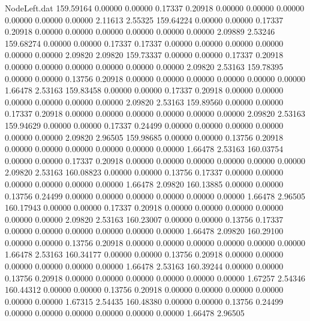 \begin{filecontents}{NodeLeft.dat}
 159.59164    0.00000    0.00000     0.17337    0.20918    0.00000    0.00000    0.00000    0.00000    0.00000    0.00000    2.11613    2.55325
 159.64224    0.00000    0.00000     0.17337    0.20918    0.00000    0.00000    0.00000    0.00000    0.00000    0.00000    2.09889    2.53246
 159.68274    0.00000    0.00000     0.17337    0.17337    0.00000    0.00000    0.00000    0.00000    0.00000    0.00000    2.09820    2.09820
 159.73337    0.00000    0.00000     0.17337    0.20918    0.00000    0.00000    0.00000    0.00000    0.00000    0.00000    2.09820    2.53163
 159.78395    0.00000    0.00000     0.13756    0.20918    0.00000    0.00000    0.00000    0.00000    0.00000    0.00000    1.66478    2.53163
 159.83458    0.00000    0.00000     0.17337    0.20918    0.00000    0.00000    0.00000    0.00000    0.00000    0.00000    2.09820    2.53163
 159.89560    0.00000    0.00000     0.17337    0.20918    0.00000    0.00000    0.00000    0.00000    0.00000    0.00000    2.09820    2.53163
 159.94629    0.00000    0.00000     0.17337    0.24499    0.00000    0.00000    0.00000    0.00000    0.00000    0.00000    2.09820    2.96505
 159.98685    0.00000    0.00000     0.13756    0.20918    0.00000    0.00000    0.00000    0.00000    0.00000    0.00000    1.66478    2.53163
 160.03754    0.00000    0.00000     0.17337    0.20918    0.00000    0.00000    0.00000    0.00000    0.00000    0.00000    2.09820    2.53163
 160.08823    0.00000    0.00000     0.13756    0.17337    0.00000    0.00000    0.00000    0.00000    0.00000    0.00000    1.66478    2.09820
 160.13885    0.00000    0.00000     0.13756    0.24499    0.00000    0.00000    0.00000    0.00000    0.00000    0.00000    1.66478    2.96505
 160.17943    0.00000    0.00000     0.17337    0.20918    0.00000    0.00000    0.00000    0.00000    0.00000    0.00000    2.09820    2.53163
 160.23007    0.00000    0.00000     0.13756    0.17337    0.00000    0.00000    0.00000    0.00000    0.00000    0.00000    1.66478    2.09820
 160.29100    0.00000    0.00000     0.13756    0.20918    0.00000    0.00000    0.00000    0.00000    0.00000    0.00000    1.66478    2.53163
 160.34177    0.00000    0.00000     0.13756    0.20918    0.00000    0.00000    0.00000    0.00000    0.00000    0.00000    1.66478    2.53163
 160.39244    0.00000    0.00000     0.13756    0.20918    0.00000    0.00000    0.00000    0.00000    0.00000    0.00000    1.67257    2.54346
 160.44312    0.00000    0.00000     0.13756    0.20918    0.00000    0.00000    0.00000    0.00000    0.00000    0.00000    1.67315    2.54435
 160.48380    0.00000    0.00000     0.13756    0.24499    0.00000    0.00000    0.00000    0.00000    0.00000    0.00000    1.66478    2.96505

\end{filecontents}
